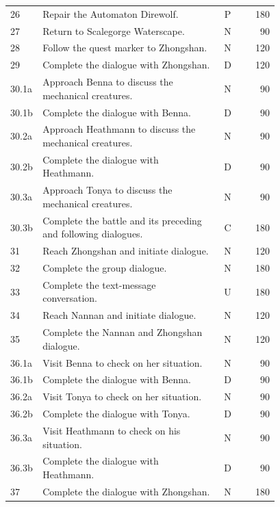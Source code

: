 \begin{table}[t]
\begin{minipage}[t]{0.485\linewidth}
\begin{tabular*}{\linewidth}{@{}p{0.12\linewidth}@{\hspace{5pt}}p{0.66\linewidth}@{\extracolsep{\fill}}cr@{}}
26 & \raggedright Repair the Automaton Direwolf. & P & 180 \\[0.5pt]
27 & \raggedright Return to Scalegorge Waterscape. & N & 90 \\[0.5pt]
28 & \raggedright Follow the quest marker to Zhongshan. & N & 120 \\[0.5pt]
29 & \raggedright Complete the dialogue with Zhongshan. & D & 120 \\[0.5pt]
30.1a & \raggedright Approach Benna to discuss the mechanical creatures. & N & 90 \\[0.5pt]
30.1b & \raggedright Complete the dialogue with Benna. & D & 90 \\[0.5pt]
30.2a & \raggedright Approach Heathmann to discuss the mechanical creatures. & N & 90 \\[0.5pt]
30.2b & \raggedright Complete the dialogue with Heathmann. & D & 90 \\[0.5pt]
30.3a & \raggedright Approach Tonya to discuss the mechanical creatures. & N & 90 \\[0.5pt]
30.3b & \raggedright Complete the battle and its preceding and following dialogues. & C & 180 \\[0.5pt]
31 & \raggedright Reach Zhongshan and initiate dialogue. & N & 120 \\[0.5pt]
32 & \raggedright Complete the group dialogue. & N & 180 \\[0.5pt]
33 & \raggedright Complete the text-message conversation. & U & 180 \\[0.5pt]
34 & \raggedright Reach Nannan and initiate dialogue. & N & 120 \\[0.5pt]
35 & \raggedright Complete the Nannan and Zhongshan dialogue. & N & 120 \\[0.5pt]
36.1a & \raggedright Visit Benna to check on her situation. & N & 90 \\[0.5pt]
36.1b & \raggedright Complete the dialogue with Benna. & D & 90 \\[0.5pt]
36.2a & \raggedright Visit Tonya to check on her situation. & N & 90 \\[0.5pt]
36.2b & \raggedright Complete the dialogue with Tonya. & D & 90 \\[0.5pt]
36.3a & \raggedright Visit Heathmann to check on his situation. & N & 90 \\[0.5pt]
36.3b & \raggedright Complete the dialogue with Heathmann. & D & 90 \\[0.5pt]
37 & \raggedright Complete the dialogue with Zhongshan. & N & 180 \\[0.5pt]

\end{tabular*}
\end{minipage}
\end{table}

